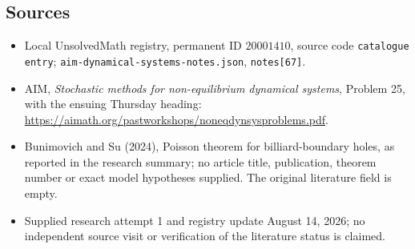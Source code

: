 \documentclass[11pt]{article}
\begin{document}
\subsection{Sources}
\begin{itemize}
\item Local UnsolvedMath registry, permanent ID \(20001410\), source code \texttt{catalogue entry}; \texttt{aim-dynamical-systems-notes.json}, \texttt{notes[67]}.
\item AIM, \emph{Stochastic methods for non-equilibrium dynamical systems}, Problem 25, with the ensuing Thursday heading: \url{https://aimath.org/pastworkshops/noneqdynsysproblems.pdf}.
\item Bunimovich and Su (2024), Poisson theorem for billiard-boundary holes, as reported in the research summary; no article title, publication, theorem number or exact model hypotheses supplied. The original literature field is empty.
\item Supplied research attempt 1 and registry update August 14, 2026; no independent source visit or verification of the literature status is claimed.
\end{itemize}
\end{document}
